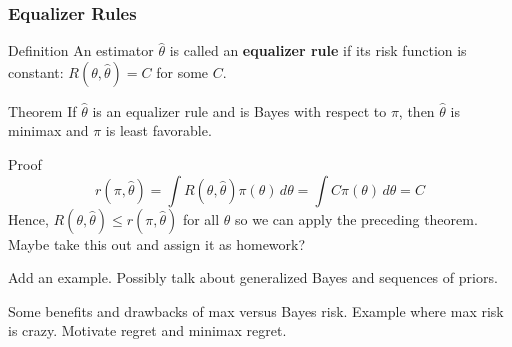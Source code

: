 \begin{frame}
  \frametitle{Equalizer Rules}
  \begin{block}{Definition}
    An estimator $\widehat{\theta}$ is called an \textbf{equalizer rule} if its risk function is constant: $R(\theta, \widehat{\theta}) = C$ for some $C$.
  \end{block}

  \begin{block}{Theorem}
    If $\widehat{\theta}$ is an equalizer rule and is Bayes with respect to $\pi$, then $\widehat{\theta}$ is minimax and $\pi$ is least favorable.
  \end{block}
  
  \begin{block}{Proof}
    \vspace{-2em}
    \[
      r(\pi, \widehat{\theta}) = \int R(\theta, \widehat{\theta})\pi(\theta)\, d\theta = \int C \pi(\theta) \, d\theta = C 
    \]
    Hence, $R(\theta, \widehat{\theta}) \leq r(\pi, \widehat{\theta})$ for all $\theta$ so we can apply the preceding theorem. \alert{Maybe take this out and assign it as homework?}
  \end{block}

\end{frame}
\begin{frame}
  Add an example. Possibly talk about generalized Bayes and sequences of priors.
\end{frame}
\begin{frame}
  Some benefits and drawbacks of max versus Bayes risk. 
  Example where max risk is crazy. 
  Motivate regret and minimax regret.
\end{frame}
